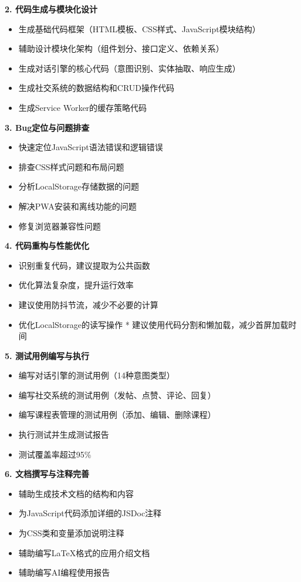 \documentclass[12pt,a4paper]{article}
\begin{document}
\textbf{2. 代码生成与模块化设计}
\begin{itemize}
    \item 生成基础代码框架（HTML模板、CSS样式、JavaScript模块结构）
    \item 辅助设计模块化架构（组件划分、接口定义、依赖关系）
    \item 生成对话引擎的核心代码（意图识别、实体抽取、响应生成）
    \item 生成社交系统的数据结构和CRUD操作代码
    \item 生成Service Worker的缓存策略代码
\end{itemize}

\textbf{3. Bug定位与问题排查}
\begin{itemize}
    \item 快速定位JavaScript语法错误和逻辑错误
    \item 排查CSS样式问题和布局问题
    \item 分析LocalStorage存储数据的问题
    \item 解决PWA安装和离线功能的问题
    \item 修复浏览器兼容性问题
\end{itemize}

\textbf{4. 代码重构与性能优化}
\begin{itemize}
    \item 识别重复代码，建议提取为公共函数
    \item 优化算法复杂度，提升运行效率
    \item 建议使用防抖节流，减少不必要的计算
    \item 优化LocalStorage的读写操作
    * 建议使用代码分割和懒加载，减少首屏加载时间
\end{itemize}

\textbf{5. 测试用例编写与执行}
\begin{itemize}
    \item 编写对话引擎的测试用例（14种意图类型）
    \item 编写社交系统的测试用例（发帖、点赞、评论、回复）
    \item 编写课程表管理的测试用例（添加、编辑、删除课程）
    \item 执行测试并生成测试报告
    \item 测试覆盖率超过95\%
\end{itemize}

\textbf{6. 文档撰写与注释完善}
\begin{itemize}
    \item 辅助生成技术文档的结构和内容
    \item 为JavaScript代码添加详细的JSDoc注释
    \item 为CSS类和变量添加说明注释
    \item 辅助编写LaTeX格式的应用介绍文档
    \item 辅助编写AI编程使用报告
\end{itemize}
\end{document}
